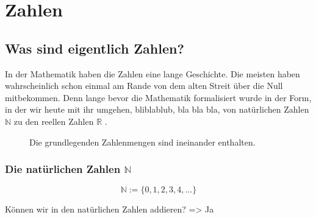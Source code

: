 \chapter{Zahlen}

\section{Was sind eigentlich Zahlen?} \label{sec:was-sind-eig-zahlen}
In der Mathematik haben die Zahlen eine lange Geschichte. Die meisten haben wahrscheinlich schon einmal am Rande von dem alten Streit über die Null mitbekommen. Denn lange bevor die Mathematik formalisiert wurde in der Form, in der wir heute mit ihr umgehen, bliblablub, bla bla bla, von natürlichen Zahlen \(\mathbb N\)  zu den reellen Zahlen \(\mathbb R\) .

\begin{figure}
    \begin{center}
    \end{center}
    \caption[short]{Die grundlegenden Zahlenmengen sind ineinander enthalten.}
\end{figure}

\subsection{Die natürlichen Zahlen \(\mathbb N\)}
\begin{definition}
    \begin{equation*}
        \mathbb N := \{0,1,2,3,4,\dots\}
    \end{equation*}
\end{definition}
Können wir in den natürlichen Zahlen addieren? => Ja

